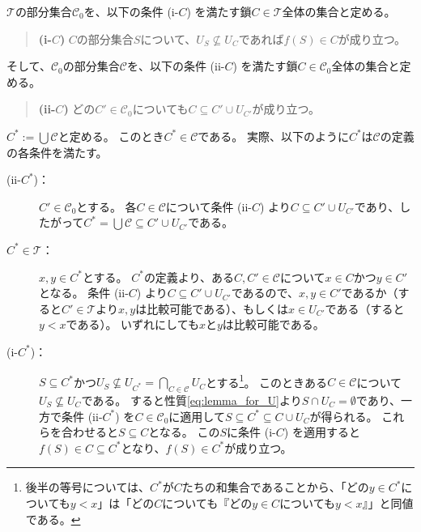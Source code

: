 ﻿\documentclass{ltjsarticle}
\theoremstyle{definition}
\begin{document}
$\mathcal{T}$の部分集合$\mathcal{C}_0$を、以下の条件 (i-$C$) を満たす鎖$C \in \mathcal{T}$全体の集合と定める。
\begin{quote}
  \textbf{(i-$C$)} $C$の部分集合$S$について、$U_S \not\subseteq U_C$であれば$f(S) \in C$が成り立つ。
\end{quote}
そして、$\mathcal{C}_0$の部分集合$\mathcal{C}$を、以下の条件 (ii-$C$) を満たす鎖$C \in \mathcal{C}_0$全体の集合と定める。
\begin{quote}
  \textbf{(ii-$C$)} どの$C' \in \mathcal{C}_0$についても$C \subseteq C' \cup U_{C'}$が成り立つ。
\end{quote}

$C^* := \bigcup \mathcal{C}$と定める。
このとき$C^* \in \mathcal{C}$である。
実際、以下のように$C^*$は$\mathcal{C}$の定義の各条件を満たす。
\begin{description}
  \item[(ii-$C^*$)：]
  $C' \in \mathcal{C}_0$とする。
  各$C \in \mathcal{C}$について条件 (ii-$C$) より$C \subseteq C' \cup U_{C'}$であり、したがって$C^* = \bigcup \mathcal{C} \subseteq C' \cup U_{C'}$である。
  \item[$C^* \in \mathcal{T}$：]
  $x,y \in C^*$とする。
  $C^*$の定義より、ある$C,C' \in \mathcal{C}$について$x \in C$かつ$y \in C'$となる。
  条件 (ii-$C$) より$C \subseteq C' \cup U_{C'}$であるので、$x,y \in C'$であるか（すると$C' \in \mathcal{T}$より$x,y$は比較可能である）、もしくは$x \in U_{C'}$である（すると$y < x$である）。
  いずれにしても$x$と$y$は比較可能である。
  \item[(i-$C^*$)：]
  $S \subseteq C^*$かつ$U_S \not\subseteq U_{C^*} = \bigcap_{C \in \mathcal{C}} U_C$とする\footnote{後半の等号については、$C^*$が$C$たちの和集合であることから、「どの$y \in C^*$についても$y < x$」は「どの$C$についても『どの$y \in C$についても$y < x$』」と同値である。}。
  このときある$C \in \mathcal{C}$について$U_S \not\subseteq U_C$である。
  すると性質\eqref{eq:lemma_for_U}より$S \cap U_C = \emptyset$であり、一方で条件 (ii-$C^*$) を$C \in \mathcal{C}_0$に適用して$S \subseteq C^* \subseteq C \cup U_C$が得られる。
  これらを合わせると$S \subseteq C$となる。
  この$S$に条件 (i-$C$) を適用すると$f(S) \in C \subseteq C^*$となり、$f(S) \in C^*$が成り立つ。
\end{description}
\end{document}
